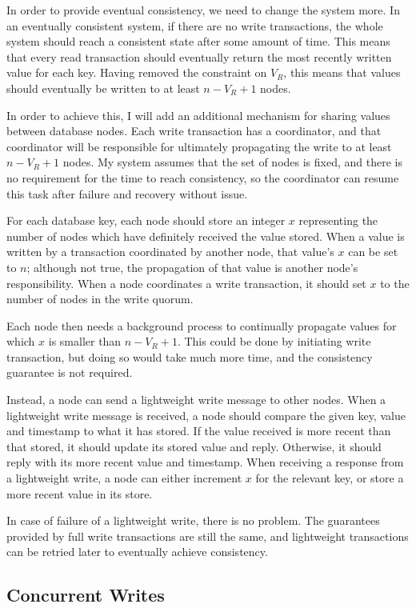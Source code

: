 \documentclass[12pt,a4paper]{article}
\begin{document}
In order to provide eventual consistency, we need to change the system more. In an eventually consistent system, if there are no write transactions, the whole system should reach a consistent state after some amount of time. This means that every read transaction should eventually return the most recently written value for each key. Having removed the constraint on $V_R$, this means that values should eventually be written to at least $n - V_R + 1$ nodes.

In order to achieve this, I will add an additional mechanism for sharing values between database nodes. Each write transaction has a coordinator, and that coordinator will be responsible for ultimately propagating the write to at least $n - V_R + 1$ nodes. My system assumes that the set of nodes is fixed, and there is no requirement for the time to reach consistency, so the coordinator can resume this task after failure and recovery without issue.

For each database key, each node should store an integer $x$ representing the number of nodes which have definitely received the value stored.  When a value is written by a transaction coordinated by another node, that value's $x$ can be set to $n$; although not true, the propagation of that value is another node's responsibility. When a node coordinates a write transaction, it should set $x$ to the number of nodes in the write quorum.

Each node then needs a background process to continually propagate values for which $x$ is smaller than $n - V_R + 1$. This could be done by initiating write transaction, but doing so would take much more time, and the consistency guarantee is not required.

Instead, a node can send a lightweight write message to other nodes. When a lightweight write message is received, a node should compare the given key, value and timestamp to what it has stored. If the value received is more recent than that stored, it should update its stored value and reply. Otherwise, it should reply with its more recent value and timestamp. When receiving a response from a lightweight write, a node can either increment $x$ for the relevant key, or store a more recent value in its store.

In case of failure of a lightweight write, there is no problem. The guarantees provided by full write transactions are still the same, and lightweight transactions can be retried later to eventually achieve consistency.

\subsection*{Concurrent Writes}
\end{document}
